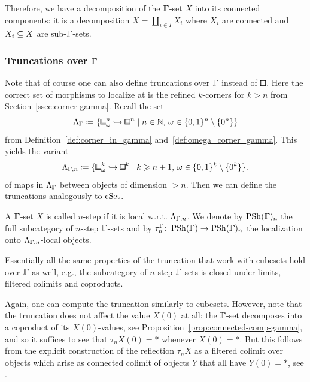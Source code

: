 Therefore, we have a decomposition of the $\bbGamma$-set $X$ into its connected components:
it is a decomposition $X = \coprod_{i\in I} X_i$ where $X_i$ are connected and $X_i\subseteq X$ are sub-$\bbGamma$-sets.

\subsubsection{Truncations over \texorpdfstring{$\bbGamma$}{Gamma}}\label{ssec:truncation-gamma}

Note that of course one can also define truncations over $\bbGamma$ instead of $\bbox$.
Here the correct set of morphisms to localize at is the refined $k$-corners for $k>n$ from Section~\ref{ssec:corner-gamma}.
Recall the set
\[
    \Lambda_{\bbGamma} \coloneq \{{\bbcor}^n_\omega\hookrightarrow{\bblox}^n \mid n\in\N,\,\omega\in\{0,1\}^n\setminus\{0^n\}\}
\]
from Definition~\ref{def:corner_in_gamma} and~\ref{def:omega_corner_gamma}.
This yields the variant
\[
    \Lambda_{\bbGamma,n} \coloneq \{{\bbcor}^k_\omega\hookrightarrow{\bblox}^k \mid k\geq n+1,\,\omega\in\{0,1\}^k\setminus\{0^k\}\}.
\]
of maps in $\Lambda_{\bbGamma}$ between objects of dimension $>n$.
Then we can define the truncations analogously to $\mathrm{cSet}$.

\begin{definition}
A $\bbGamma$-set $X$ is called $n$-step if it is local w.r.t. $\Lambda_{\bbGamma,n}$.
We denote by $\PSh(\bbGamma)_n$ the full subcategory of $n$-step $\bbGamma$-sets
and by $\tau_n^{\bbGamma}\colon\PSh(\bbGamma)\to\PSh(\bbGamma)_n$ the localization onto $\Lambda_{\bbGamma,n}$-local objects.
\end{definition}

\begin{remark}
Essentially all the same properties of the truncation that work with cubesets hold over $\bbGamma$ as well,
e.g., the subcategory of $n$-step $\bbGamma$-sets is closed under limits, filtered colimits and coproducts.
\end{remark}

Again, one can compute the truncation similarly to cubesets.
However, note that the truncation does not affect the value $X(0)$ at all:
the $\bbGamma$-set decomposes into a coproduct of its $X(0)$-values, see Proposition~\ref{prop:connected-comp-gamma},
and so it suffices to see that $\tau_n X(0) = \ast$ whenever $X(0) = \ast$.
But this follows from the explicit construction of the reflection $\tau_n X$ as a filtered colimit over objects which arise as connected colimit of objects $Y$ that all have $Y(0) = \ast$,
see \cite[Construction 1.37]{Adamek1994}.

